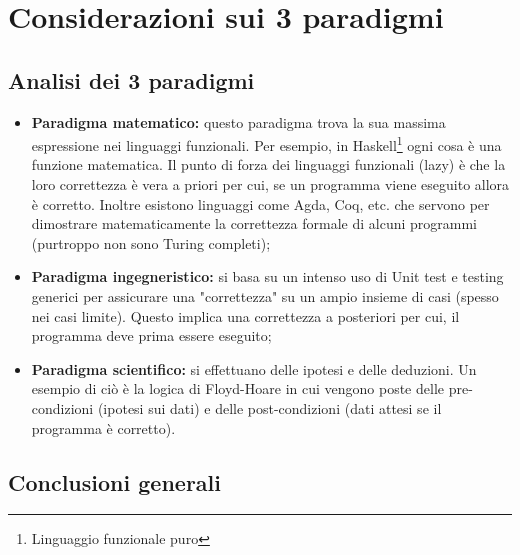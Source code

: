 \section{Considerazioni sui 3 paradigmi}
\subsection{Analisi dei 3 paradigmi}




\begin{itemize}
    \item \textbf{Paradigma matematico:} questo paradigma trova la sua massima espressione nei linguaggi funzionali. Per esempio, in Haskell\footnote{Linguaggio funzionale puro} ogni cosa è una funzione matematica. Il punto di forza dei linguaggi funzionali (lazy) è che la loro correttezza è vera a priori per cui, se un programma viene eseguito allora è corretto. Inoltre esistono linguaggi come Agda, Coq, etc. che servono per dimostrare matematicamente la correttezza formale di alcuni programmi (purtroppo non sono Turing completi);
    \item \textbf{Paradigma ingegneristico:} si basa su un intenso uso di Unit test e testing generici per assicurare una "correttezza" su un ampio insieme di casi (spesso nei casi limite). Questo implica una correttezza a posteriori per cui, il programma deve prima essere eseguito;
    \item \textbf{Paradigma scientifico:} si effettuano delle ipotesi e delle deduzioni. Un esempio di ciò è la logica di Floyd-Hoare in cui vengono poste delle pre-condizioni (ipotesi sui dati) e delle post-condizioni (dati attesi se il programma è corretto). 
\end{itemize}

\subsection{Conclusioni generali}

